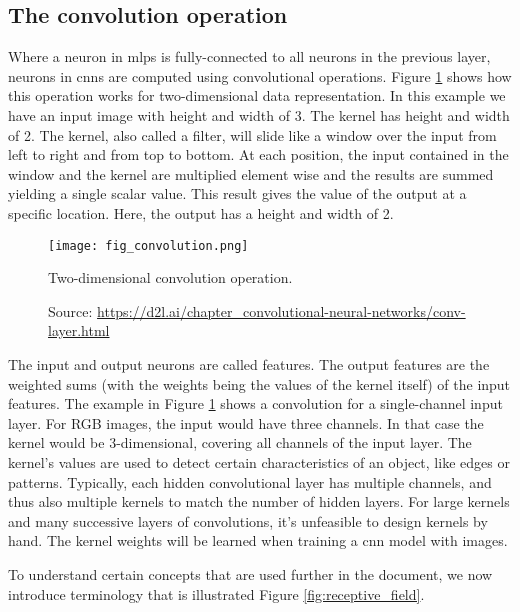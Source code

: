 \subsection{The convolution operation}
Where a neuron in \acrshort{mlp}s is fully-connected to all neurons in the previous layer, neurons in \acrshort{cnn}s are computed using convolutional operations. Figure \ref{fig:convolution} shows how this operation works for two-dimensional data representation. In this example we have an input image with height and width of 3. The kernel has height and width of 2. The kernel, also called a filter, will slide like a window over the input from left to right and from top to bottom. At each position, the input contained in the window and the kernel are multiplied element wise and the results are summed yielding a single scalar value. This result gives the value of the output at a specific location. Here, the output has a height and width of 2.
\begin{figure}[ht]
    \begin{center}       
    \texttt{[image: fig\_convolution.png]}
    \caption[Two-dimensional convolution operation]{Two-dimensional convolution operation.}
    \caption*{Source: \href{https://d2l.ai/chapter\_convolutional-neural-networks/conv-layer.html}{https://d2l.ai/chapter\_convolutional-neural-networks/conv-layer.html}}
    \label{fig:convolution}
    \end{center}
\end{figure}

The input and output neurons are called features. The output features are the weighted sums (with the weights being the values of the kernel itself) of the input features. The example in Figure \ref{fig:convolution} shows a convolution for a single-channel input layer. For RGB images, the input would have three channels. In that case the kernel would be 3-dimensional, covering all channels of the input layer. The kernel's values are used to detect certain characteristics of an object, like edges or patterns. Typically, each hidden convolutional layer has multiple channels, and thus also multiple kernels to match the number of hidden layers. For large kernels and many successive layers of convolutions, it's unfeasible to design kernels by hand. The kernel weights will be learned when training a \acrshort{cnn} model with images.

To understand certain concepts that are used further in the document, we now introduce terminology that is illustrated Figure \ref{fig:receptive_field}.

